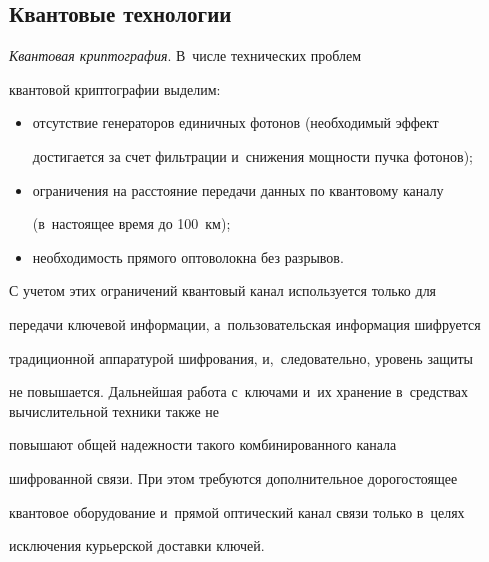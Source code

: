    


   \subsection{Квантовые технологии}


   


   \vspace*{-2pt}


   


   \textit{Квантовая криптография}. В~числе технических проблем 


квантовой криптографии выделим:


   \begin{itemize}


\item отсутствие генераторов единичных фотонов (необходимый эффект 


достигается за счет фильтрации и~снижения мощности пучка фотонов);


\item ограничения на расстояние передачи данных по квантовому каналу 


(в~настоящее время до 100~км);


\item необходимость прямого оптоволокна без разрывов.


\end{itemize}


   С учетом этих ограничений квантовый канал используется только для 


передачи ключевой информации, а~пользовательская информация шифруется 


традиционной аппаратурой шифрования, и,~следовательно, уровень защиты 


не повышается. Дальнейшая работа с~ключами и~их хранение в~средствах вычислительной техники также не 


повышают общей надежности такого комбинированного канала 


шифрованной связи. При этом требуются дополнительное дорогостоящее 


квантовое оборудование и~прямой оптический канал связи только в~целях 


исключения курьерской доставки ключей. 





\vspace*{-4pt}






